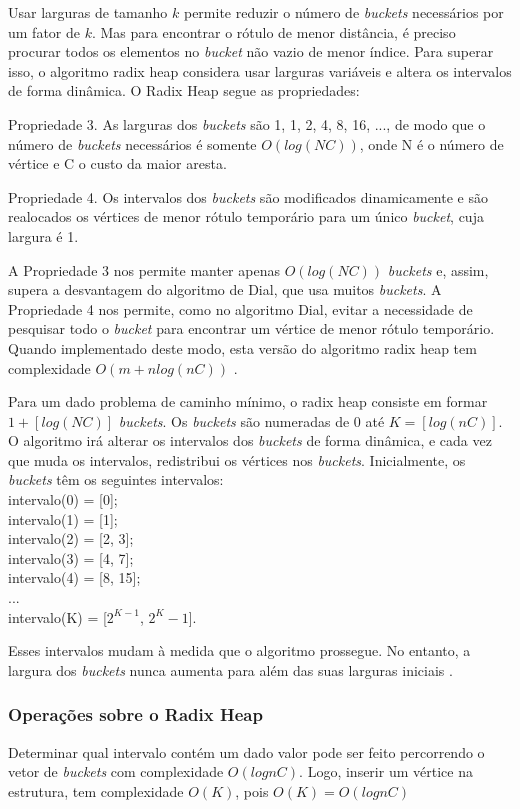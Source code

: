 Usar larguras de tamanho $k$ permite reduzir o número de \textit{buckets} necessários por um fator de $k$.
Mas para encontrar o rótulo de menor distância, é preciso procurar todos os elementos no \textit{bucket} não vazio de menor índice.
Para superar isso, o algoritmo radix heap considera usar larguras variáveis e altera os intervalos de forma dinâmica. 
O Radix Heap segue as pro\-prie\-dades:

Propriedade 3. As larguras dos \textit{buckets} são 1, 1, 2, 4, 8, 16, ..., de modo que o número de \textit{buckets} necessários é somente $O(log(NC))$,
onde N é o número de vértice e C o custo da maior aresta.

Propriedade 4.  Os intervalos dos \textit{buckets} são modificados dinamicamente e são realocados os vértices de menor rótulo temporário
para um único \textit{bucket}, cuja largura é 1.

A Propriedade 3 nos permite manter apenas $O(log(NC))$ \textit{buckets} e, assim, supera a desvantagem do algoritmo
de Dial, que usa muitos \textit{buckets}.
A Propriedade 4 nos permite, como no algoritmo Dial, evitar a necessidade de 
pesquisar todo o \textit{bucket} para encontrar um vértice de menor rótulo temporário. Quando implementado deste modo, esta 
versão do algoritmo radix heap tem complexidade $O(m + nlog(nC))$ \cite{bookahuja}.

Para um dado problema de caminho mínimo, o radix heap consiste em formar $1 + [log(NC)]$ \textit{buckets}.
Os \textit{buckets} são numeradas de $0$ até $K = [log(nC)]$.
O algoritmo irá alterar os intervalos dos \textit{buckets} de forma dinâmica, e cada vez que muda os intervalos,
redistribui os vértices nos \textit{buckets}. Inicialmente, os \textit{buckets} têm os seguintes intervalos:\\
intervalo(0) = [0];\\
intervalo(1) = [1];\\
intervalo(2) = [2, 3];\\
intervalo(3) = [4, 7];\\
intervalo(4) = [8, 15];\\
...\\
intervalo(K) = [$2^{K - 1}$, $2^K - 1$].

Esses intervalos mudam à medida que o algoritmo prossegue. No entanto, a largura dos \textit{buckets} nunca aumenta
para além das suas larguras iniciais \cite{bookahuja}.

\subsubsection{Operações sobre o Radix Heap}
Determinar qual intervalo contém um dado valor pode ser feito percorrendo o vetor de \textit{buckets} com complexidade $O(lognC)$.
Logo, inserir um vértice na estrutura, tem complexidade $O(K)$, pois $O(K) = O(log nC)$

